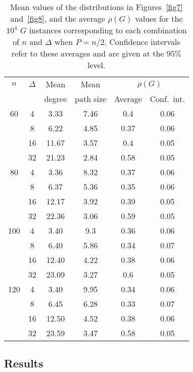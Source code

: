 \documentclass{article}
\begin{document}
\begin{table}[t]
\centering
\caption{Mean values of the distributions in Figures~\ref{fig7} and~\ref{fig8},
and the average $\rho(G)$ values for the $10^4$ $G$ instances corresponding to
each combination of $n$ and $\Delta$ when $P=n/2$. Confidence intervals refer to
these averages and are given at the $95\%$ level.}
\begin{tabular}{cccccc}
\hline
$n$ & $\Delta$ & Mean   & Mean      & \multicolumn{2}{c}{ $\rho(G)$} \\ \cline{5-6}
    &          & degree & path size & Average & Conf.\ int. \\ \hline
60  & 4        & 3.33   & 7.46      & 0.4     & 0.06 \\
    & 8        & 6.22   & 4.85      & 0.37    & 0.06 \\
    & 16       & 11.67  & 3.57      & 0.4     & 0.05 \\
    & 32       & 21.23  & 2.84      & 0.58    & 0.05 \\ \hline
80  & 4        & 3.36   & 8.32      & 0.37    & 0.06 \\
    & 8        & 6.37   & 5.36      & 0.35    & 0.06 \\
    & 16       & 12.17  & 3.92      & 0.39    & 0.05 \\
    & 32       & 22.36  & 3.06      & 0.59    & 0.05 \\ \hline
100 & 4        & 3.40   & 9.3       & 0.36    & 0.06 \\
    & 8        & 6.40   & 5.86      & 0.34    & 0.07 \\
    & 16       & 12.40  & 4.22      & 0.38    & 0.06 \\
    & 32       & 23.09  & 3.27      & 0.6     & 0.05 \\ \hline
120 & 4        & 3.40   & 9.95      & 0.34    & 0.06 \\
    & 8        & 6.45   & 6.28      & 0.33    & 0.07 \\
    & 16       & 12.50  & 4.52      & 0.38    & 0.06 \\
    & 32       & 23.59  & 3.47      & 0.58    & 0.05 \\ \hline
\end{tabular}

 \label{tab1}
\end{table}

\subsection{Results}
\end{document}

